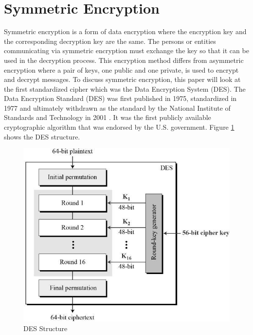 \documentclass[journal]{IEEEtran}
\begin{document}
\section{\textbf{Symmetric Encryption}}
Symmetric encryption is a form of data encryption where the encryption key and the corresponding decryption key are the same. The persons or entities communicating via symmetric encryption must exchange the key so that it can be used in the decryption process. This encryption method differs from asymmetric encryption where a pair of keys, one public and one private, is used to encrypt and decrypt messages. To discuss symmetric encryption, this paper will look at the first standardized cipher which was the Data Encryption System (DES). 
\newline \newline
The Data Encryption Standard (DES) was first published in 1975, standardized in 1977 and ultimately withdrawn as the standard by the National Institute of Standards and Technology in 2001 \cite{des}. It was the first publicly available cryptographic algorithm that was endorsed by the U.S. government. Figure \ref{fig:des} shows the DES structure.
\newline
\newline
\begin{figure}[!h]
    \centering
    \includegraphics[scale=.3]{des_structure}
    \caption{DES Structure}
    \label{fig:des}
\end{figure}
\end{document}
